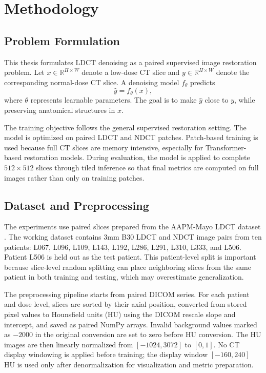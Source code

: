\chapter{Methodology}

\section{Problem Formulation}

This thesis formulates LDCT denoising as a paired supervised image restoration problem. Let \(x \in \mathbb{R}^{H \times W}\) denote a low-dose CT slice and \(y \in \mathbb{R}^{H \times W}\) denote the corresponding normal-dose CT slice. A denoising model \(f_{\theta}\) predicts
\begin{equation}
    \hat{y}=f_{\theta}(x),
\end{equation}
where \(\theta\) represents learnable parameters. The goal is to make \(\hat{y}\) close to \(y\), while preserving anatomical structures in \(x\).

The training objective follows the general supervised restoration setting. The model is optimized on paired LDCT and NDCT patches. Patch-based training is used because full CT slices are memory intensive, especially for Transformer-based restoration models. During evaluation, the model is applied to complete \(512 \times 512\) slices through tiled inference so that final metrics are computed on full images rather than only on training patches.

\section{Dataset and Preprocessing}

The experiments use paired slices prepared from the AAPM-Mayo LDCT dataset \cite{aapm}. The working dataset contains 3mm B30 LDCT and NDCT image pairs from ten patients: L067, L096, L109, L143, L192, L286, L291, L310, L333, and L506. Patient L506 is held out as the test patient. This patient-level split is important because slice-level random splitting can place neighboring slices from the same patient in both training and testing, which may overestimate generalization.

The preprocessing pipeline starts from paired DICOM series. For each patient and dose level, slices are sorted by their axial position, converted from stored pixel values to Hounsfield units (HU) using the DICOM rescale slope and intercept, and saved as paired NumPy arrays. Invalid background values marked as \(-2000\) in the original conversion are set to zero before HU conversion. The HU images are then linearly normalized from \([-1024, 3072]\) to \([0,1]\). No CT display windowing is applied before training; the display window \([-160, 240]\) HU is used only after denormalization for visualization and metric preparation.


